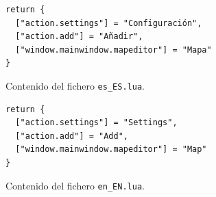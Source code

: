 \begin{itemize}
\begin{itemize}
\begin{figure}[t]
 \begin{minipage}{0.6\textwidth}
  \centering
  \begin{verbatim}
return {
  ["action.settings"] = "Configuración",
  ["action.add"] = "Añadir",
  ["window.mainwindow.mapeditor"] = "Mapa"
}
  \end{verbatim}
  \caption{Contenido del fichero \texttt{es\_ES.lua}.}
  \label{fig:luaes}
 \end{minipage}
 \begin{minipage}{0.6\textwidth}
  \centering
  \begin{verbatim}
return {
  ["action.settings"] = "Settings",
  ["action.add"] = "Add",
  ["window.mainwindow.mapeditor"] = "Map"
}
  \end{verbatim}
  \caption{Contenido del fichero \texttt{en\_EN.lua}.}
  \label{fig:luaen}
 \end{minipage}
  \label{fig:lualang}
\end{figure}


\end{itemize}
\end{itemize}
